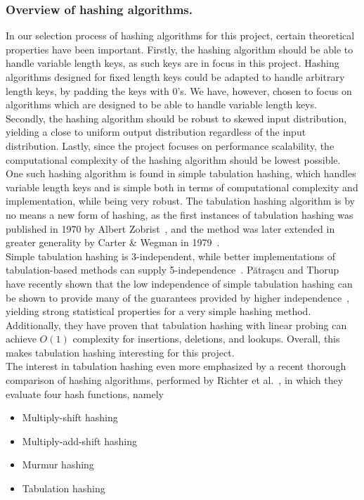 \documentclass[11pt]{article} %
\begin{document}
\subsubsection{Overview of hashing algorithms.}
\label{subsubsec:background_review_of_hashing_algorithms}
In our selection process of hashing algorithms for this project, certain theoretical properties have been important. Firstly, the hashing algorithm should be able to handle variable length keys, as such keys are in focus in this project. Hashing algorithms designed for fixed length keys could be adapted to handle arbitrary length keys, by padding the keys with 0's. We have, however, chosen to focus on algorithms which are designed to be able to handle variable length keys. Secondly, the hashing algorithm should be robust to skewed input distribution, yielding a close to uniform output distribution regardless of the input distribution. Lastly, since the project focuses on performance scalability, the computational complexity of the hashing algorithm should be lowest possible.\\

One such hashing algorithm is found in simple tabulation hashing, which handles variable length keys and is simple both in terms of computational complexity and implementation, while being very robust. The tabulation hashing algorithm is by no means a new form of hashing, as the first instances of tabulation hashing was published in 1970 by Albert Zobrist~\cite{Zobrist}, and the method was later extended in greater generality by Carter \& Wegman in 1979~\cite{WC79}. \\

Simple tabulation hashing is 3-independent, while better implementations of tabulation-based methods can supply 5-independence~\cite{TZ09}. Pătraşcu and Thorup have recently shown that the low independence of simple tabulation hashing can be shown to provide many of the guarantees provided by higher independence~\cite{PT11}, yielding strong statistical properties for a very simple hashing method. Additionally, they have proven that tabulation hashing with linear probing can achieve $O(1)$ complexity for insertions, deletions, and lookups. Overall, this makes tabulation hashing interesting for this project.\\

The interest in tabulation hashing even more emphasized by a recent thorough comparison of hashing algorithms, performed by Richter et al.~\cite{RAD15}, in which they evaluate four hash functions, namely
\begin{itemize}
\item Multiply-shift hashing
\item Multiply-add-shift hashing
\item Murmur hashing
\item Tabulation hashing
\end{itemize}
\end{document}
